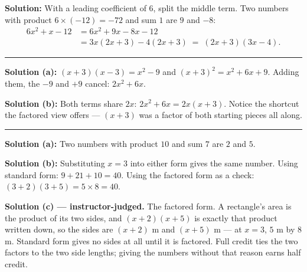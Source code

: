 \documentclass[12pt]{article}
\begin{document}
\textbf{Solution:} \quad With a leading coefficient of $6$, split the middle term. Two numbers with
product $6\times(-12) = -72$ and sum $1$ are $9$ and $-8$:
\begin{align*}
  6x^2 + x - 12 &= 6x^2 + 9x - 8x - 12\\
                &= 3x(2x + 3) - 4(2x + 3) \;=\; (2x + 3)(3x - 4).
\end{align*}

\vspace{0.15cm}\noindent\rule{\linewidth}{0.2pt}


\textbf{Solution (a):} \quad $(x+3)(x-3) = x^2 - 9$ and $(x+3)^2 = x^2 + 6x + 9$. Adding them, the
$-9$ and $+9$ cancel: $2x^2 + 6x$. 

\noindent\textbf{Solution (b):} \quad Both terms share $2x$: $2x^2 + 6x = 2x(x + 3)$. Notice the
shortcut the factored view offers --- $(x+3)$ was a factor of both starting pieces all along.

\vspace{0.15cm}\noindent\rule{\linewidth}{0.2pt}


\textbf{Solution (a):} \quad Two numbers with product $10$ and sum $7$ are $2$ and $5$.

\noindent\textbf{Solution (b):} \quad Substituting $x = 3$ into either form gives the same number.
Using standard form: $9 + 21 + 10 = 40$. Using the factored form as a check:
$(3+2)(3+5) = 5\times 8 = 40$. 

\noindent\textbf{Solution (c) --- instructor-judged.} The factored form. A rectangle's area is the
product of its two sides, and $(x+2)(x+5)$ is exactly that product written down, so the sides are
$(x+2)$ m and $(x+5)$ m --- at $x = 3$, $5$ m by $8$ m. Standard form gives no sides at all until
it is factored. Full credit ties the two factors to the two side lengths; giving the numbers
without that reason earns half credit.
\end{document}
